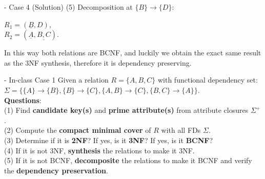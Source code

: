 \begin{frame}[fragile]{ - Case 4 (Solution)}
	(5) Decomposition at $\{B\} \rightarrow \{D\}$:\\\vspace{5pt}
	
	$R_1 = (\underline{B}, D),$\\
	$R_2 = (\underline{A}, \underline{B, C}).$\\\vspace{5pt}
	
	In this way both relations are BCNF, and luckily we obtain the exact same result as the 3NF synthesis, therefore it is dependency preserving.\\\vspace{5pt}
	
\end{frame}

\begin{frame}[fragile]{ - In-class Case 1}
	Given a relation $R=\{A, B, C\}$ with functional dependency set:\\ 
	$\Sigma=\{\{A\} \rightarrow \{B\},\{B\} \rightarrow \{C\}, \{A, B\} \rightarrow \{C\},\{B, C\} \rightarrow \{A\}\}.$\\\vspace{10pt}
	\textbf{Questions}:\\
	(1) Find \textbf{candidate key(s)} and \textbf{prime attribute(s)} from attribute closures $\Sigma^{+}$.\\
	(2) Compute the \textbf{compact minimal cover} of $R$ with all FDs $\Sigma$.\\
	(3) Determine if it is \textbf{2NF}? If yes, is it \textbf{3NF}? If yes, is it \textbf{BCNF}?\\
	(4) If it is not 3NF, \textbf{synthesis} the relations to make it 3NF.\\
	(5) If it is not BCNF, \textbf{decomposite} the relations to make it BCNF and verify the \textbf{dependency preservation}. 
\end{frame}

